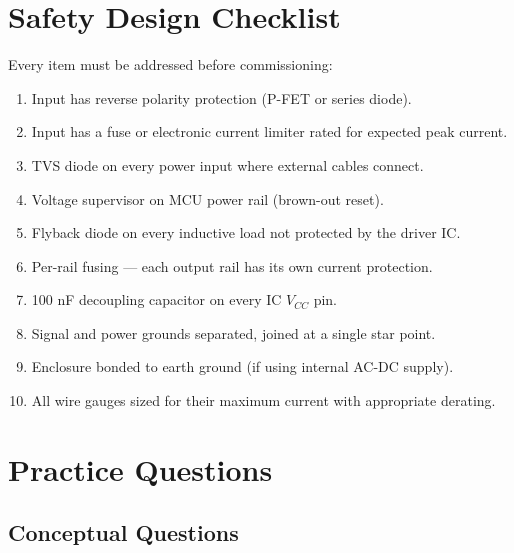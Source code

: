 \documentclass[11pt,letterpaper,twoside,openany]{book}
\begin{document}
\FloatBarrier
\section{Safety Design Checklist}
\label{sec:checklist}

Every item must be addressed before commissioning:

\begin{enumerate}[leftmargin=1.5em]
  \item Input has reverse polarity protection (P-FET or series diode).
  \item Input has a fuse or electronic current limiter rated for expected peak current.
  \item TVS diode on every power input where external cables connect.
  \item Voltage supervisor on MCU power rail (brown-out reset).
  \item Flyback diode on every inductive load not protected by the driver IC.
  \item Per-rail fusing --- each output rail has its own current protection.
  \item 100\,\,nF decoupling capacitor on every IC $V_{CC}$ pin.
  \item Signal and power grounds separated, joined at a single star point.
  \item Enclosure bonded to earth ground (if using internal AC-DC supply).
  \item All wire gauges sized for their maximum current with appropriate derating.
\end{enumerate}


\FloatBarrier
\section{Practice Questions}
\label{sec:practice}

\subsection{Conceptual Questions}
\end{document}
